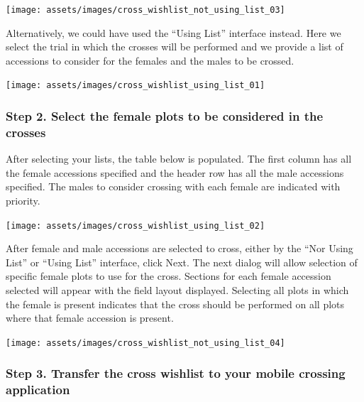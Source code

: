 \documentclass[
  12pt,
]{book}
\begin{document}
\begin{center}\texttt{[image: assets/images/cross\_wishlist\_not\_using\_list\_03]} \end{center}

Alternatively, we could have used the ``Using List'' interface instead. Here we select the trial in which the crosses will be performed and we provide a list of accessions to consider for the females and the males to be crossed.

\begin{center}\texttt{[image: assets/images/cross\_wishlist\_using\_list\_01]} \end{center}

\hypertarget{step-2.-select-the-female-plots-to-be-considered-in-the-crosses}{%
\subsubsection*{Step 2. Select the female plots to be considered in the crosses}\label{step-2.-select-the-female-plots-to-be-considered-in-the-crosses}}


After selecting your lists, the table below is populated. The first column has all the female accessions specified and the header row has all the male accessions specified. The males to consider crossing with each female are indicated with priority.

\begin{center}\texttt{[image: assets/images/cross\_wishlist\_using\_list\_02]} \end{center}

After female and male accessions are selected to cross, either by the ``Nor Using List'' or ``Using List'' interface, click Next. The next dialog will allow selection of specific female plots to use for the cross. Sections for each female accession selected will appear with the field layout displayed. Selecting all plots in which the female is present indicates that the cross should be performed on all plots where that female accession is present.

\begin{center}\texttt{[image: assets/images/cross\_wishlist\_not\_using\_list\_04]} \end{center}

\hypertarget{step-3.-transfer-the-cross-wishlist-to-your-mobile-crossing-application}{%
\subsubsection*{Step 3. Transfer the cross wishlist to your mobile crossing application}\label{step-3.-transfer-the-cross-wishlist-to-your-mobile-crossing-application}}
\end{document}
